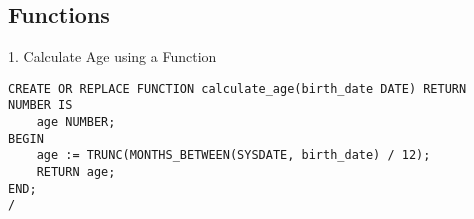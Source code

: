\subsection{Functions}
\hrulefill

1. Calculate Age using a  Function 

\begin{lstlisting}[caption={ Query 1},label={lst:q-1}]
    CREATE OR REPLACE FUNCTION calculate_age(birth_date DATE) RETURN NUMBER IS
    age NUMBER;
BEGIN
    age := TRUNC(MONTHS_BETWEEN(SYSDATE, birth_date) / 12);
    RETURN age;
END;
/

\end{lstlisting}